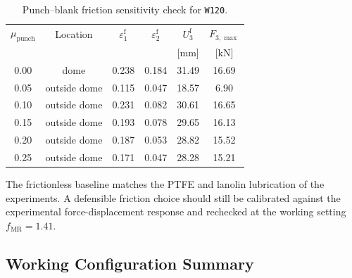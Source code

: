 \begin{table}[H]
    \centering
    \small
    \setlength{\tabcolsep}{5pt}
    \begin{tabular}{c c c c c c}
        \toprule
        $\mu_\mathrm{punch}$ &
        Location &
        $\varepsilon_1^\mathrm{f}$ &
        $\varepsilon_2^\mathrm{f}$ &
        $U_3^\mathrm{f}$ &
        $F_{3,\max}$ \\
        & & & & [\si{\milli\meter}] & [\si{\kilo\newton}]  \\
        \midrule
        0.00 & dome         & 0.238 & 0.184 & 31.49 & 16.69 \\
        0.05 & outside dome & 0.115 & 0.047 & 18.57 &  6.90 \\
        0.10 & outside dome & 0.231 & 0.082 & 30.61 & 16.65  \\
        0.15 & outside dome & 0.193 & 0.078 & 29.65 & 16.13  \\
        0.20 & outside dome & 0.187 & 0.053 & 28.82 & 15.52  \\
        0.25 & outside dome & 0.171 & 0.047 & 28.28 & 15.21  \\
        \bottomrule
    \end{tabular}
    \caption{Punch--blank friction sensitivity check for \texttt{W120}.}
    \label{tab:friction_sensitivity_summary}
\end{table}

The frictionless baseline matches the PTFE and lanolin lubrication of the
experiments. A defensible friction choice should still be calibrated against
the experimental force-displacement response and rechecked at the working
setting $f_\mathrm{MR}=1.41$.

\subsection{Working Configuration Summary}
\label{sec:numerical_output_status}

